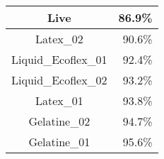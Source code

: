 \begin{tabular}{ c   r }
    Live                & 86.9\% \\ \hline\hline
    Latex\_02           & 90.6\% \\ 
    Liquid\_Ecoflex\_01 & 92.4\% \\
    Liquid\_Ecoflex\_02 & 93.2\% \\
    Latex\_01           & 93.8\% \\
    Gelatine\_02        & 94.7\% \\
    Gelatine\_01        & 95.6\%
\end{tabular}
